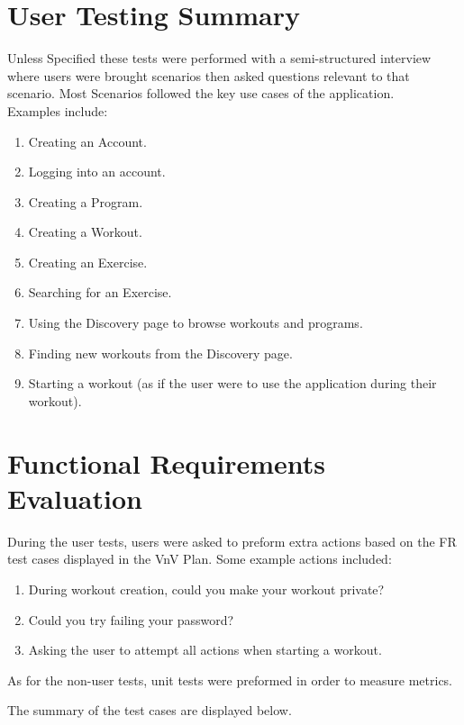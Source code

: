 \documentclass[12pt, titlepage]{article}
\begin{document}
\section{User Testing Summary}
Unless Specified these tests were performed with a semi-structured interview where users were brought scenarios then asked questions relevant to that scenario. Most Scenarios followed the key use cases of the application.\\
Examples include:
\begin{enumerate}
	\item Creating an Account.
	\item Logging into an account.
	\item Creating a Program.
	\item Creating a Workout.
	\item Creating an Exercise.
	\item Searching for an Exercise.
	\item Using the Discovery page to browse workouts and programs.
	\item Finding new workouts from the Discovery page.
	\item Starting a workout (as if the user were to use the application during their workout).
\end{enumerate}


\section{Functional Requirements Evaluation}

\noindent During the user tests, users were asked to preform extra actions based on the FR test cases displayed in the VnV Plan.
Some example actions included: \\
\begin{enumerate}
	\item During workout creation, could you make your workout private?
	\item Could you try failing your password?
	\item Asking the user to attempt all actions when starting a workout.
\end{enumerate}

\noindent As for the non-user tests, unit tests were preformed in order to measure metrics.

\noindent The summary of the test cases are displayed below.
\end{document}
